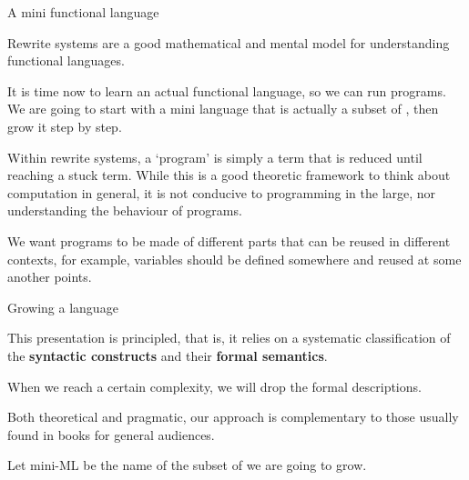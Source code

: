 %
\begin{frame}{A mini functional language}

  Rewrite systems are a good mathematical and mental model for
  understanding functional languages.

  \bigskip

  It is time now to learn an actual functional language, so we can run
  programs. We are going to start with a mini language that is
  actually a subset of \OCaml, then grow it step by step.

  \bigskip

  Within rewrite systems, a `program' is simply a term that is reduced
  until reaching a stuck term. While this is a good theoretic
  framework to think about computation in general, it is not conducive
  to programming in the large, nor understanding the behaviour of
  programs.

  \bigskip

  We want programs to be made of different parts that can be reused in
  different contexts, for example, variables should be defined
  somewhere and reused at some another points.

\end{frame}

%
\begin{frame}{Growing a language}

  This presentation is principled, that is, it relies on a systematic
  classification of the \textbf{syntactic constructs} and their
  \textbf{formal semantics}.

  \bigskip

  When we reach a certain complexity, we will drop the formal
  descriptions.

  \bigskip

  Both theoretical and pragmatic, our approach is complementary to
  those usually found in books for general audiences.

  \bigskip

  Let mini-ML be the name of the subset of \OCaml we are going to
  grow.

\end{frame}

